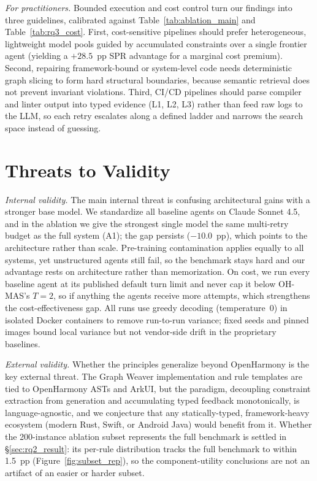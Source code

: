 \documentclass[10pt,conference]{IEEEtran}
\begin{document}
\textit{For practitioners.} Bounded execution and cost control turn our findings into three guidelines, calibrated against Table~\ref{tab:ablation_main} and Table~\ref{tab:rq3_cost}. 
First, cost-sensitive pipelines should prefer heterogeneous, lightweight model pools guided by accumulated constraints over a single frontier agent (yielding a $+28.5$~pp SPR advantage for a marginal cost premium). 
Second, repairing framework-bound or system-level code needs deterministic graph slicing to form hard structural boundaries, because semantic retrieval does not prevent invariant violations. 
Third, CI/CD pipelines should parse compiler and linter output into typed evidence (L1, L2, L3) rather than feed raw logs to the LLM, so each retry escalates along a defined ladder and narrows the search space instead of guessing.

\section{Threats to Validity}
\label{sec:threats}

\textit{Internal validity.} 
The main internal threat is confusing architectural gains with a stronger base model. We standardize all baseline agents on Claude Sonnet 4.5, and in the ablation we give the strongest single model the same multi-retry budget as the full system (A1); the gap persists ($-10.0$~pp), which points to the architecture rather than scale. Pre-training contamination applies equally to all systems, yet unstructured agents still fail, so the benchmark stays hard and our advantage rests on architecture rather than memorization. On cost, we run every baseline agent at its published default turn limit and never cap it below OH-MAS's $T{=}2$, so if anything the agents receive more attempts, which strengthens the cost-effectiveness gap. All runs use greedy decoding (temperature~0) in isolated Docker containers to remove run-to-run variance; fixed seeds and pinned images bound local variance but not vendor-side drift in the proprietary baselines.

\textit{External validity.} 
Whether the principles generalize beyond OpenHarmony is the key external threat. The Graph Weaver implementation and rule templates are tied to OpenHarmony ASTs and ArkUI, but the paradigm, decoupling constraint extraction from generation and accumulating typed feedback monotonically, is language-agnostic, and we conjecture that any statically-typed, framework-heavy ecosystem (modern Rust, Swift, or Android Java) would benefit from it. Whether the 200-instance ablation subset represents the full benchmark is settled in \S\ref{sec:rq2_result}: its per-rule distribution tracks the full benchmark to within 1.5~pp (Figure~\ref{fig:subset_rep}), so the component-utility conclusions are not an artifact of an easier or harder subset.
\end{document}
